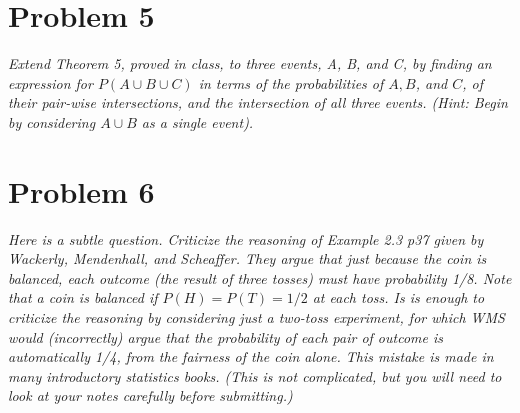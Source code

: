 \documentclass{article}
\begin{document}
\section*{Problem 5}
	\emph{Extend Theorem 5, proved in class, to three events, A, B, and C, by finding an expression for $P(A \cup B \cup C)$ in terms of the probabilities of $A, B$, and $C$, of their pair-wise intersections, and the intersection of all three events. (Hint: Begin by considering $A \cup B$ as a single event). }
\pagebreak
\section*{Problem 6}
	\emph{Here is a subtle question. Criticize the reasoning of Example 2.3 p37 given by Wackerly, Mendenhall, and Scheaffer. They argue that just because the coin is balanced, each outcome (the result of three tosses) must have probability 1/8. Note that a coin is balanced if $P(H) = P(T) = 1/2$ at each toss. Is is enough to criticize the reasoning by considering just a two-toss experiment, for which WMS would (incorrectly) argue that the probability of each pair of outcome is automatically 1/4, from the fairness of the coin alone. This mistake is made in many introductory statistics books. (This is not complicated, but you will need to look at your notes carefully before submitting.)
	}
\end{document}
